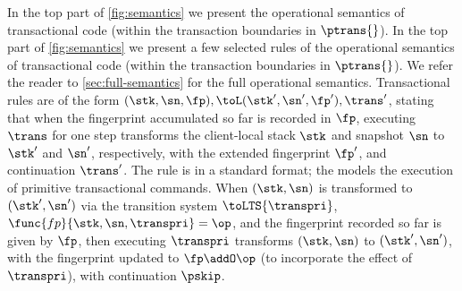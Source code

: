 \ifTechReport%
In the top part of \cref{fig:semantics} we present the operational semantics of transactional code (within the transaction boundaries in $\ptrans{}$). 
\else%
In the top part of \cref{fig:semantics} we present a few selected rules of the operational semantics of transactional code (within the transaction boundaries in $\ptrans{}$). 
We refer the reader to \cref{sec:full-semantics} for the full operational semantics.
\fi%
%
Transactional rules are of the form $(\stk, \sn, \fp), \toL (\stk', \sn', \fp'), \trans'$, 
stating that when the fingerprint accumulated so far is recorded in $\fp$, 
executing $\trans$ for one step transforms the client-local stack $\stk$ 
and snapshot $\sn$ %
to $\stk'$ and $\sn'$, respectively, with the extended fingerprint $\fp'$, and continuation $\trans'$.
The  rule is in a standard format; 
the   models the execution of primitive transactional commands.
When $(\stk, \sn)$ is transformed to $(\stk', \sn')$ via the transition system $\toLTS{\transpri}$,
$\func{fp}{\stk, \sn, \transpri} = \op$, and the fingerprint recorded so far is given by $\fp$, 
then executing $\transpri$ transforms $(\stk, \sn)$ to $(\stk', \sn')$, with the fingerprint updated to $\fp \addO \op$ (to incorporate the effect of $\transpri$), with continuation $\pskip$. 







